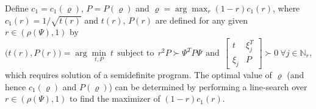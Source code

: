 \documentclass[11pt, oneside]{article}
\begin{document}
Define $c_1 = c_1(\varrho)$, $P = P(\varrho)$ and 
$\varrho = \arg\max_{r} (1-r) c_1(r)$, where $c_1(r) = 1/\sqrt{t(r)}$ and $t(r)$, $P(r)$ are defined for any given $r\in(\rho(\Psi),1)$ by
\[
\bigl(t(r),P(r)\bigr) 
= \arg\min_{t,P}\ t \ \ \text{subject to} \ \
r^2 P \succ \Psi^T P \Psi \ \ \text{and} \ \
\begin{bmatrix} t & \xi_j^T \\ \xi_j & P\end{bmatrix} \succ 0 \ \forall j\in\mathbb N_r ,
\]
which requires solution of a semidefinite program. The optimal value of $\varrho$ (and hence $c_1(\varrho)$ and $P(\varrho)$) can be determined by performing a line-search over $r\in(\rho(\Psi),1)$ to find the maximizer of $(1-r)c_1(r)$.
\end{document}
